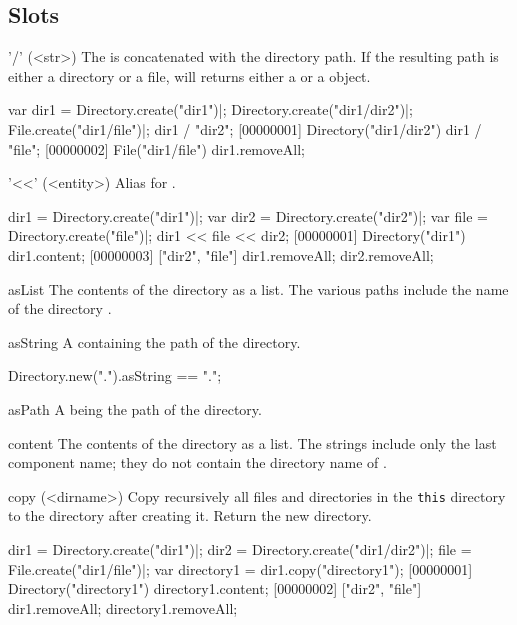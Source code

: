 \subsection{Slots}
\begin{urbiscriptapi}
\item['/'](<str>)
  The   is concatenated with the directory path.
  If the resulting path is either a directory or a file,  will
  returns either a  or a  object.
\begin{urbiscript}
var dir1 = Directory.create("dir1")|;
Directory.create("dir1/dir2")|;
File.create("dir1/file")|;
dir1 / "dir2";
[00000001] Directory("dir1/dir2")
dir1 / "file";
[00000002] File("dir1/file")
dir1.removeAll;
\end{urbiscript}

\item['<<'](<entity>)
  Alias for .
\begin{urbiscript}
dir1 = Directory.create("dir1")|;
var dir2 = Directory.create("dir2")|;
var file = Directory.create("file")|;
dir1 << file << dir2;
[00000001] Directory("dir1")
dir1.content;
[00000003] ["dir2", "file"]
dir1.removeAll;
dir2.removeAll;
\end{urbiscript}

\item[asList]
  The contents of the directory as a  list.  The
  various paths include the name of the directory \this.

\item[asString] A  containing the path of the directory.
\begin{urbiassert}
Directory.new(".").asString == ".";
\end{urbiassert}

\item[asPath] A  being the path of the directory.

\item[content]
  The contents of the directory as a  list.  The
  strings include only the last component name; they do not contain
  the directory name of \this.

\item[copy](<dirname>)
  Copy recursively all files and directories in the \lstinline|this| directory
  to the directory  after creating it. Return the new directory.
\begin{urbiscript}
dir1 = Directory.create("dir1")|;
dir2 = Directory.create("dir1/dir2")|;
file = File.create("dir1/file")|;
var directory1 = dir1.copy("directory1");
[00000001] Directory("directory1")
directory1.content;
[00000002] ["dir2", "file"]
dir1.removeAll;
directory1.removeAll;
\end{urbiscript}


\end{urbiscriptapi}
